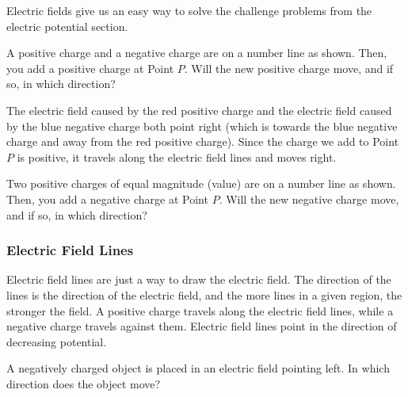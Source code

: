 \documentclass[12pt,paper=letter]{scrartcl}
\begin{document}
    \pnp

    Electric fields give us an easy way to solve the challenge problems from the electric potential section.

    \begin{exboxed}
        A positive charge and a negative charge are on a number line as shown.
        Then, you add a positive charge at Point $P$.
        Will the new positive charge move, and if so,
        in which direction?

        \medskip

        
    \end{exboxed}

    The electric field caused by the red positive charge and the electric field caused by the blue negative charge both point right
    (which is towards the blue negative charge and away from the red positive charge).
    Since the charge we add to Point $P$ is positive, it travels along the electric field lines and moves right.

    \begin{exrboxed}
        Two positive charges of equal magnitude (value) are on a number line as shown.
        Then, you add a negative charge at Point $P$.
        Will the new negative charge move, and if so,
        in which direction? \hint{\ref{hint:number_line}}

        \medskip

        
    \end{exrboxed}

    \subsubsection{Electric Field Lines}\label{subsec:electric-field-lines}

    Electric field lines are just a way to draw the electric field.
    The direction of the lines is the direction of the electric field,
    and the more lines in a given region, the stronger the field.
    A positive charge travels along the electric field lines,
    while a negative charge travels against them.
    Electric field lines point in the direction of decreasing potential.
    

    \begin{exrboxed}
        A negatively charged object is placed in an electric field pointing left.
        In which direction does the object move?
    \end{exrboxed}
\end{document}
